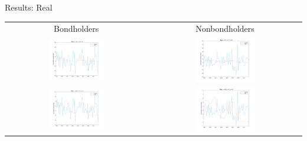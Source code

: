 \documentclass{beamer}
\begin{document}
\begin{frame}{Results: Real}
\begin{center}
\begin{tabular}{cc}
Bondholders & Nonbondholders \\
\includegraphics[width=0.4\textwidth]{figs/implied-vs-ffr/cex-bondholders/real_alpha2} & \includegraphics[width=0.4\textwidth]{figs/implied-vs-ffr/cex-nonbondholders/real_alpha2} \\
\includegraphics[width=0.4\textwidth]{figs/implied-vs-ffr/cex-bondholders/real_alpha_point2} & \includegraphics[width=0.4\textwidth]{figs/implied-vs-ffr/cex-nonbondholders/real_alpha_point2}
\end{tabular}
\end{center}
\end{frame}
\end{document}
